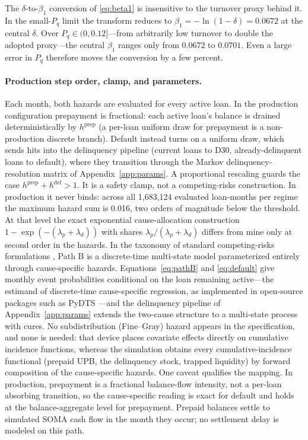 \documentclass[12pt]{article}
\begin{document}
The $\delta$-to-$\beta_1$ conversion of \eqref{eq:beta1} is insensitive to the turnover proxy behind it. In the small-$P_q$ limit the transform reduces to $\beta_1 = -\ln(1-\delta) = 0.0672$ at the central $\delta$. Over $P_q \in (0, 0.12]$---from arbitrarily low turnover to double the adopted proxy---the central $\beta_1$ ranges only from $0.0672$ to $0.0701$. Even a large error in $P_q$ therefore moves the conversion by a few percent.

\paragraph{Production step order, clamp, and parameters.}
Each month, both hazards are evaluated for every active loan. In the production configuration prepayment is fractional: each active loan's balance is drained deterministically by $h^{\mathrm{prep}}$ (a per-loan uniform draw for prepayment is a non-production discrete branch). Default instead turns on a uniform draw, which sends hits into the delinquency pipeline (current loans to D30, already-delinquent loans to default), where they transition through the Markov delinquency-resolution matrix of Appendix~\ref{app:params}. A proportional rescaling guards the case $h^{\mathrm{prep}} + h^{\mathrm{def}} > 1$. It is a safety clamp, not a competing-risks construction. In production it never binds: across all 1,683,124 evaluated loan-months per regime the maximum hazard sum is 0.016, two orders of magnitude below the threshold. At that level the exact exponential cause-allocation construction $1-\exp(-(\lambda_p+\lambda_d))$ with shares $\lambda_p/(\lambda_p+\lambda_d)$ differs from mine only at second order in the hazards. In the taxonomy of standard competing-risks formulations \citep{putter2007}, Path B is a discrete-time multi-state model parameterized entirely through cause-specific hazards. Equations~\eqref{eq:pathB} and \eqref{eq:default} give monthly event probabilities conditional on the loan remaining active---the estimand of discrete-time cause-specific regression, as implemented in open-source packages such as PyDTS \citep{meir2025}---and the delinquency pipeline of Appendix~\ref{app:params} extends the two-cause structure to a multi-state process with cures. No subdistribution (Fine--Gray) hazard \citep{fine1999} appears in the specification, and none is needed: that device places covariate effects directly on cumulative incidence functions, whereas the simulation obtains every cumulative-incidence functional (prepaid UPB, the delinquency stock, trapped liquidity) by forward composition of the cause-specific hazards. One caveat qualifies the mapping. In production, prepayment is a fractional balance-flow intensity, not a per-loan absorbing transition, so the cause-specific reading is exact for default and holds at the balance-aggregate level for prepayment. Prepaid balances settle to simulated SOMA cash flow in the month they occur; no settlement delay is modeled on this path.
\end{document}
